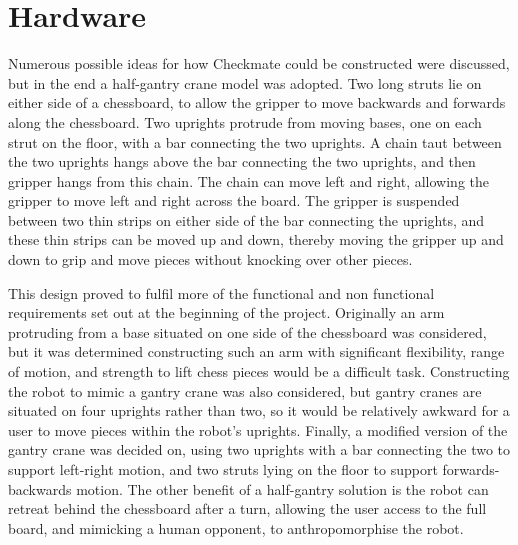 \documentclass[onecolumn]{IEEEtran}
\begin{document}
\section{Hardware}
Numerous possible ideas for how Checkmate could be constructed were discussed, but in the end a half-gantry crane model was adopted. Two long struts lie on either side of a chessboard, to allow the gripper to move backwards and forwards along the chessboard. Two uprights protrude from moving bases, one on each strut on the floor, with a bar connecting the two uprights. A chain taut between the two uprights hangs above the bar connecting the two uprights, and then gripper hangs from this chain. The chain can move left and right, allowing the gripper to move left and right across the board. The gripper is suspended between two thin strips on either side of the bar connecting the uprights, and these thin strips can be moved up and down, thereby moving the gripper up and down to grip and move pieces without knocking over other pieces. \par
This design proved to fulfil more of the functional and non functional requirements set out at the beginning of the project. Originally an arm protruding from a base situated on one side of the chessboard was considered, but it was determined constructing such an arm with significant flexibility, range of motion, and strength to lift chess pieces would be a difficult task. Constructing the robot to mimic a gantry crane was also considered, but gantry cranes are situated on four uprights rather than two, so it would be relatively awkward for a user to move pieces within the robot's uprights. Finally, a modified version of the gantry crane was decided on, using two uprights with a bar connecting the two to support left-right motion, and two struts lying on the floor to support forwards-backwards motion. The other benefit of a half-gantry solution is the robot can retreat behind the chessboard after a turn, allowing the user access to the full board, and mimicking a human opponent, to anthropomorphise the robot. \par
\end{document}
